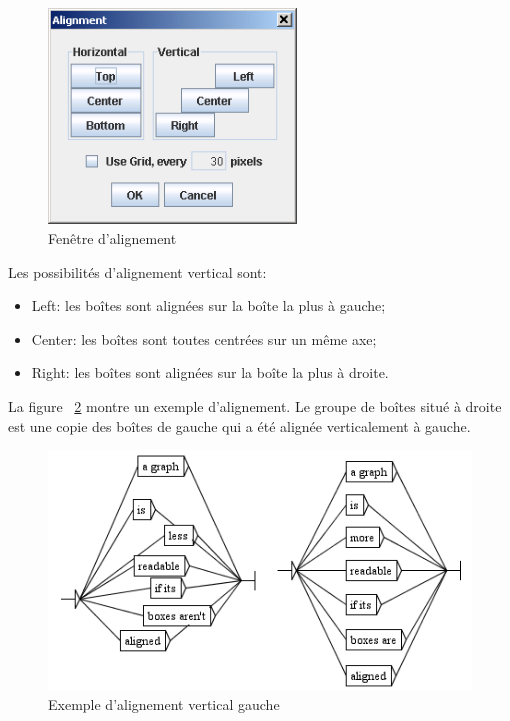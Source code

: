 \begin{figure}[!h]
\begin{center}
\includegraphics[width=6.6cm]{resources/img/fig5-23.png}
\caption{Fenêtre d’alignement\label{fig-alignment-frame}}
\end{center}
\end{figure}

\noindent Les possibilités d’alignement vertical sont:
\begin{itemize}
  \item Left: les boîtes sont alignées sur la boîte la plus à gauche;
  \item Center: les boîtes sont toutes centrées sur un même axe;
  \item Right: les boîtes sont alignées sur la boîte la plus à droite.
\end{itemize}

\bigskip
\noindent La figure ~\ref{fig-vertical-left-alignment} montre un exemple 
d’alignement. Le groupe de boîtes situé à droite est une copie des boîtes
de gauche qui a été alignée verticalement à gauche.


\bigskip
\begin{figure}[!h]
\begin{center}
\includegraphics[width=11.5cm]{resources/img/fig5-24.png}
\caption{Exemple d’alignement vertical gauche\label{fig-vertical-left-alignment}}
\end{center}
\end{figure}

